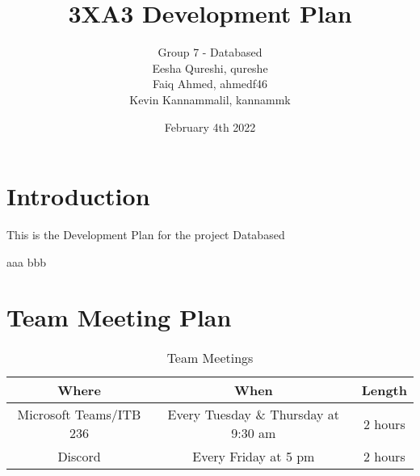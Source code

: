 \documentclass[12pt,letterpaper]{article}
\title{3XA3 Development Plan}
\author{Group 7 - Databased \\ Eesha Qureshi, qureshe \\ Faiq Ahmed, ahmedf46 \\ Kevin Kannammalil, kannammk}
\date{February 4th 2022}
\begin{document}
\maketitle



\newpage
\tableofcontents

\newpage
\section{Introduction}

This is the Development Plan for the project Databased

aaa bbb

\section{Team Meeting Plan}
\begin{table}[H]
    \centering
    \begin{tabular}{ |c|c|c| } 
    \hline
    Where & When & Length \\
    \hline
    Microsoft Teams/ITB 236 & Every Tuesday \& Thursday at 9:30 am & 2 hours \\
    Discord & Every Friday at 5 pm & 2 hours \\
    \hline
    \end{tabular}
    \caption{Team Meetings}
    \label{tab:teammeetings}
\end{table}
\end{document}
